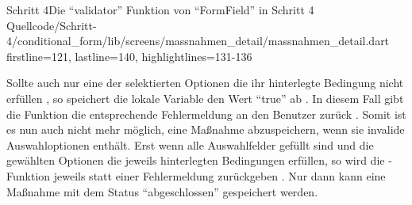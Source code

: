 \begin{alexlisting}{Schritt 4}{Die \enquote{validator} Funktion von \enquote{FormField} in Schritt 4}
  {Quellcode/Schritt-4/conditional_form/lib/screens/massnahmen_detail/massnahmen_detail.dart}
  {firstline=121, lastline=140, highlightlines={131-136}}
  \label{lst:Schritt4validator}
\end{alexlisting}

Sollte auch nur eine der selektierten Optionen  die ihr hinterlegte Bedingung nicht erfüllen ,
so speichert die lokale Variable  den Wert \enquote{true} ab .
In diesem Fall gibt die Funktion die entsprechende Fehlermeldung an den Benutzer zurück .
Somit ist es nun auch nicht mehr möglich,
eine Maßnahme abzuspeichern,
wenn sie invalide Auswahloptionen enthält.
Erst wenn alle Auswahlfelder gefüllt sind
und die gewählten Optionen die jeweils hinterlegten Bedingungen erfüllen,
so wird die -Funktion jeweils  statt einer Fehlermeldung zurückgeben .
Nur dann kann eine Maßnahme mit dem Status \enquote{abgeschlossen} gespeichert werden.




